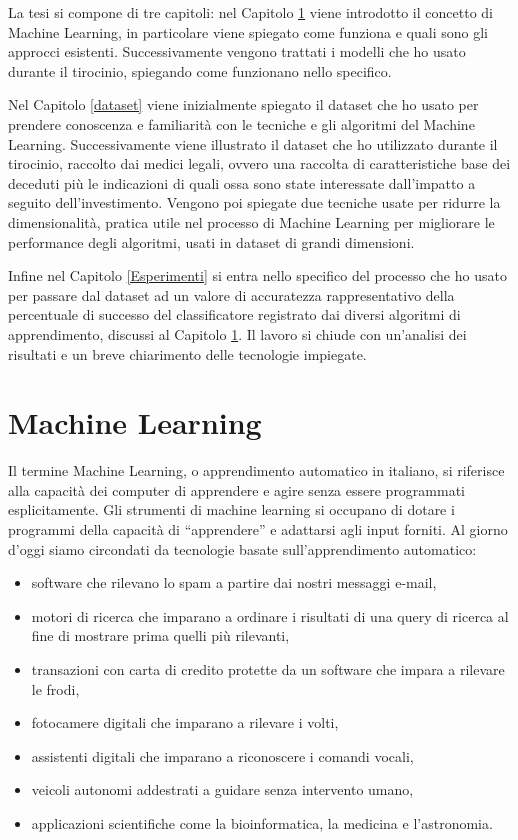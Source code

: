 \documentclass[12pt,italian]{report}
\begin{document}
La tesi si compone di tre capitoli: nel Capitolo \ref{machinelearning} viene introdotto il concetto di Machine Learning, in particolare viene spiegato come funziona e quali sono gli approcci esistenti. Successivamente vengono trattati i modelli che ho usato durante il tirocinio, spiegando come funzionano nello specifico.

Nel Capitolo \ref{dataset} viene inizialmente spiegato il dataset che ho usato per prendere conoscenza e familiarità con le tecniche e gli algoritmi del Machine Learning. Successivamente viene illustrato il dataset che ho utilizzato durante il tirocinio, raccolto dai medici legali, ovvero una raccolta di caratteristiche base dei deceduti più le indicazioni di quali ossa sono state interessate dall'impatto a seguito dell'investimento. Vengono poi spiegate due tecniche usate per ridurre la dimensionalità, pratica utile nel processo di Machine Learning per migliorare le performance degli algoritmi, usati in dataset di grandi dimensioni. 

Infine nel Capitolo \ref{Esperimenti} si entra nello specifico del processo che ho usato per passare dal dataset ad un valore di accuratezza rappresentativo della percentuale di successo del classificatore registrato dai diversi algoritmi di apprendimento, discussi al Capitolo \ref{machinelearning}. Il lavoro si chiude con un'analisi dei risultati e un breve chiarimento delle tecnologie impiegate.




\chapter{Machine Learning}
\label{machinelearning}
Il termine Machine Learning, o apprendimento automatico in italiano, si riferisce alla capacità dei computer di apprendere e agire senza essere programmati esplicitamente.
Gli strumenti di machine learning si occupano di dotare i programmi della capacità di ``apprendere'' e adattarsi agli input forniti.
Al giorno d'oggi siamo circondati da tecnologie basate sull'apprendimento automatico:
\begin{itemize}
	\item software che rilevano lo spam a partire dai nostri messaggi e-mail, 
	\item motori di ricerca che imparano a ordinare i risultati di una query di ricerca al fine di mostrare prima quelli più rilevanti, 
	\item transazioni con carta di credito protette da un software che impara a rilevare le frodi, 
	\item fotocamere digitali che imparano a rilevare i volti, 
	\item assistenti digitali che imparano a riconoscere i comandi vocali, 
	\item veicoli autonomi addestrati a guidare senza intervento umano, 
	\item applicazioni scientifiche come la bioinformatica, la medicina e l'astronomia.
\end{itemize}
\end{document}
